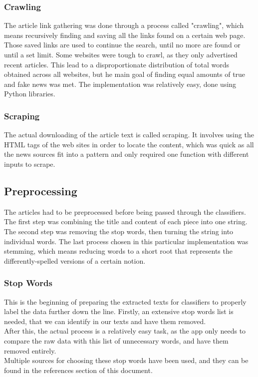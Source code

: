 \documentclass{article}
\begin{document}
	\subsubsection{Crawling}
	The article link gathering was done through a process called "crawling", which means recursively finding and saving all the links found on a certain web page. Those saved links are used to continue the search, until no more are found or until a set limit. Some websites were tough to crawl, as they only advertised recent articles. This lead to a disproportionate distribution of total words obtained across all websites, but he main goal of finding equal amounts of true and fake news was met. The implementation was relatively easy, done using Python libraries.
	\subsubsection{Scraping}
	The actual downloading of the article text is called scraping. It involves using the HTML tags of the web sites in order to locate the content, which was quick as all the news sources fit into a pattern and only required one function with different inputs to scrape.
	
\subsection{Preprocessing}
	The articles had to be preprocessed before being passed through the classifiers. The first step was combining the title and content of each piece into one string. The second step was removing the stop words, then turning the string into individual words. The last process chosen in this particular implementation was stemming, which means reducing words to a short root that represents the differently-spelled versions of a certain notion.
	\subsubsection{Stop Words}
	This is the beginning of preparing the extracted texts for classifiers to properly label the data further down the line. Firstly, an extensive stop words list is needed, that we can identify in our texts and have them removed.\\After this, the actual process is a relatively easy task, as the app only needs to compare the raw data with this list of unnecessary words, and have them removed entirely.\\
	Multiple sources for choosing these stop words have been used, and they can be found in the references section of this document.
\end{document}
